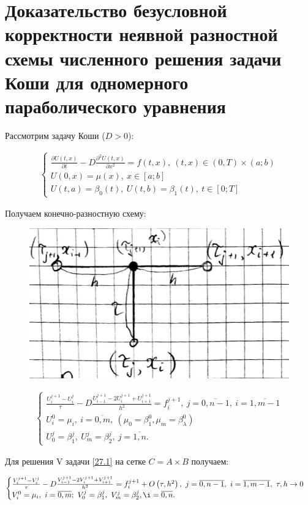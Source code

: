 \documentclass[__main__.tex]{subfiles}
\begin{document}
\section{Доказательство безусловной корректности неявной разностной схемы численного решения задачи Коши для одномерного параболического уравнения}

Рассмотрим задачу Коши ($D>0$):

\begin{gather}\label{27.1}
\begin{cases}
\frac{\partial U \left(t,x\right)}{\partial t} - D \frac{\partial^2 U \left( t,x \right)}{\partial x^2} = f \left( t,x \right), \ \left(t,x\right) \in \left(0,T\right) \times \left( a;b \right) \\
U\left(0,x\right) = \mu \left(x\right), \ x \in \left[a;b\right] \\
U(t,a) = \beta_0 \left(t\right), \ U\left( t,b \right) = \beta_1 \left(t\right), \ t\in\left[0;T\right]
\end{cases}
\end{gather}

Получаем конечно-разностную схему:

\begin{figure}[h!]
	\centering
	\includegraphics[width=0.03\linewidth]{img/img_27.1}
	\caption{}
	\label{img_27.1}
\end{figure}

\begin{gather}\label{27.2}
\begin{cases}
\frac{U^{j+1}_i - U^j_i}{\tau} - D \frac{U^{j+1}_{i-1} - 2 U^{j+1}_i+U^{j+1}_{i+1}}{h^2} = f^{j+1}_i, \ j = \overline{0,n-1}, \ i = \overline{1,m-1} \\
U^0_i = \mu_i, \ i = \overline{0,m}, \ \left( \mu_0 = \beta^0_1, \mu_m = \beta^0_\lambda \right) \\
U^j_0 = \beta^j_1, \ U^j_m = \beta^j_2, \ j = \overline{1,n}.
\end{cases}
\end{gather}

Для решения V задачи \ref{27.1} на сетке $C = A \times B$ получаем:

\begin{gather} \label{27.3}
\begin{cases}
\frac{V^{j+1}_i - V^j_i}{\tau} - D \frac{V^{j+1}_{i-1} - 2V^{j+1}_i +V^{j+1}_{i+1}}{h^2} = f^{j+1}_i + O \left( \tau, h^2 \right), \ j = \overline{0,n-1}, \ i = \overline{1,m-1}, \ \tau, h \rightarrow 0 \\
V^0_i = \mu_i, \ i = \overline{0,m}; \ V^j_0 = \beta^j_1, \ V^j_m = \beta^j_2, \i= \overline{0,n}.
\end{cases}
\end{gather}
\end{document}
